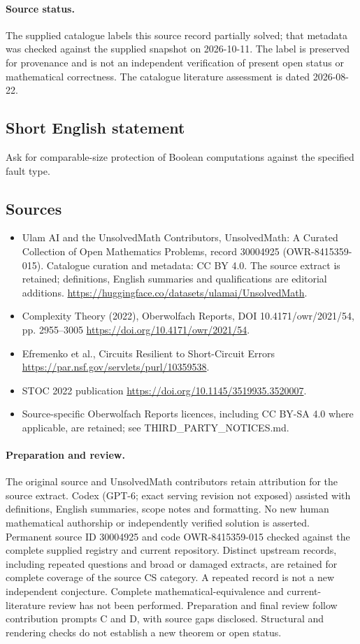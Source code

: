 \documentclass[11pt]{article}
\begin{document}
\paragraph{Source status.}
The supplied catalogue labels this source record partially solved; that metadata was checked against the supplied snapshot on 2026-10-11. The label is preserved for provenance and is not an independent verification of present open status or mathematical correctness. The catalogue literature assessment is dated 2026-08-22.
\subsection{Short English statement}
Ask for comparable-size protection of Boolean computations against the specified fault type.
\subsection{Sources}
\begin{itemize}
\item[\hypertarget{source:30004925:1}{S1}] Ulam AI and the UnsolvedMath Contributors, UnsolvedMath: A Curated Collection of Open Mathematics Problems, record 30004925 (OWR-8415359-015). Catalogue curation and metadata: CC BY 4.0. The source extract is retained; definitions, English summaries and qualifications are editorial additions.
\url{https://huggingface.co/datasets/ulamai/UnsolvedMath}.
\item[\hypertarget{source:30004925:2}{S2}] Complexity Theory (2022), Oberwolfach Reports, DOI 10.4171/owr/2021/54, pp. 2955--3005
\url{https://doi.org/10.4171/owr/2021/54}.
\item[\hypertarget{source:30004925:3}{S3}] Efremenko et al., Circuits Resilient to Short-Circuit Errors
\url{https://par.nsf.gov/servlets/purl/10359538}.
\item[\hypertarget{source:30004925:4}{S4}] STOC 2022 publication
\url{https://doi.org/10.1145/3519935.3520007}.
\item Source-specific Oberwolfach Reports licences, including CC BY-SA 4.0 where applicable, are retained; see THIRD\_PARTY\_NOTICES.md.
\end{itemize}
\paragraph{Preparation and review.}
The original source and UnsolvedMath contributors retain attribution for the source extract. Codex (GPT-6; exact serving revision not exposed) assisted with definitions, English summaries, scope notes and formatting. No new human mathematical authorship or independently verified solution is asserted. Permanent source ID 30004925 and code OWR-8415359-015 checked against the complete supplied registry and current repository. Distinct upstream records, including repeated questions and broad or damaged extracts, are retained for complete coverage of the source CS category. A repeated record is not a new independent conjecture. Complete mathematical-equivalence and current-literature review has not been performed. Preparation and final review follow contribution prompts C and D, with source gaps disclosed. Structural and rendering checks do not establish a new theorem or open status.
\label{end:30004925}
\end{document}
